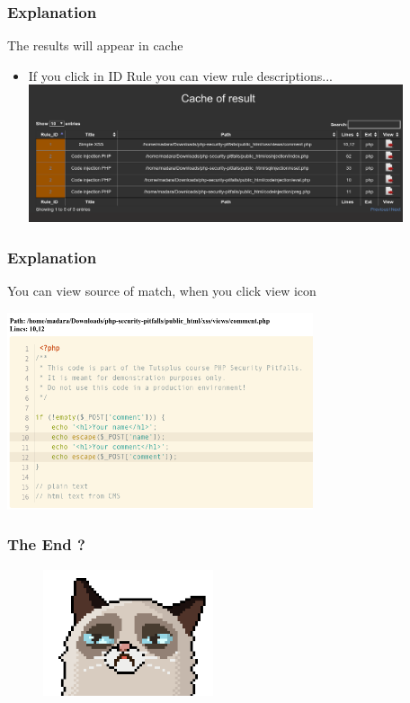 \documentclass[serif,mathserif]{beamer}
\begin{document}
\begin{frame}
  \frametitle{Explanation}
  The results will appear in cache
  \begin{itemize}
  \item If you click in ID Rule you can view rule descriptions...		  
  \includegraphics[width=11cm]{images/cache.png} 
  \end{itemize}
\end{frame}


\begin{frame}
  \frametitle{Explanation}
  You can view source of match, when you click view icon
  \begin{itemize}	
  \includegraphics[width=9cm]{images/codeview.png} 
  \end{itemize}
\end{frame}


\begin{frame}
  \frametitle{The End ?}
  \begin{figure}[]    
    \centering
    \includegraphics[width=5cm]{images/codecat00.png} 
  \end{figure}
\end{frame}
\end{document}
